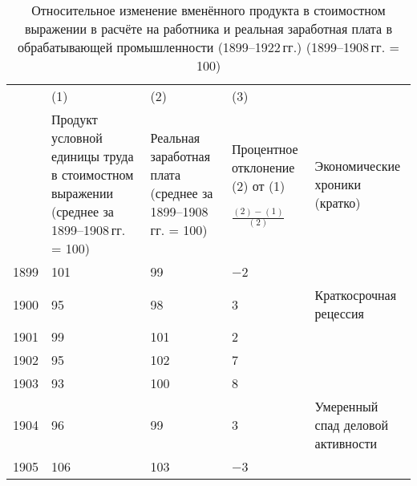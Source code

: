 \documentclass[leqno]{article}  %
\begin{document}
\par
\begin{table}
\centering
\footnotesize{
\caption{Относительное изменение вменённого продукта в стоимостном выражении в расчёте на работника и реальная заработная плата в обрабатывающей промышленности (1899--1922\,гг.) (1899--1908\,гг. = 100)}%
\label{tab11}%
\begin{tabular}{p{}|p{}|p{}|p{}|p{}}
\hline
& \centering (1) & \centering (2) & \centering (3) & \\
& Продукт условной единицы труда в стоимостном выражении (среднее за 1899--1908\,гг. = 100) & Реальная заработная плата (среднее за 1899--1908\,гг. = 100) & Процентное отклонение (2) от (1) \par \(\frac{(2)-(1)}{(2)}\) & Экономические хроники (кратко) \\
\hline
1899 & \hfill 101 \hspace*{6mm} & \hfill 99 \hspace*{6mm} & \hfill \(-\)2 \hspace*{6mm} & \\
1900 & \hfill 95 \hspace*{6mm} & \hfill 98 \hspace*{6mm} & \hfill 3 \hspace*{6mm} & Краткосрочная рецессия \\
1901 & \hfill 99 \hspace*{6mm} & \hfill 101 \hspace*{6mm} & \hfill 2 \hspace*{6mm} & \\
1902 & \hfill 95 \hspace*{6mm} & \hfill 102 \hspace*{6mm} & \hfill 7 \hspace*{6mm} & \\
1903 & \hfill 93 \hspace*{6mm} & \hfill 100 \hspace*{6mm} & \hfill 8 \hspace*{6mm} & \\
1904 & \hfill 96 \hspace*{6mm} & \hfill 99 \hspace*{6mm} & \hfill 3 \hspace*{6mm} & Умеренный спад деловой активности \\
1905 & \hfill 106 \hspace*{6mm} & \hfill 103 \hspace*{6mm} & \hfill \(-\)3 \hspace*{6mm} & \\

\end{tabular}}
\end{table}
\end{document}
